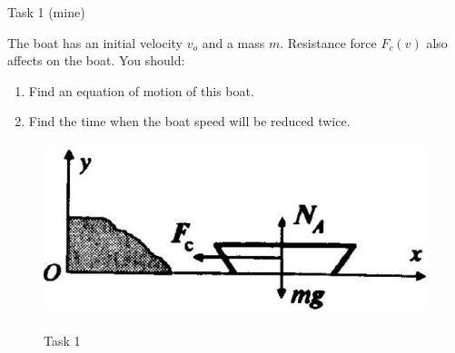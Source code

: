 \documentclass[aspectratio=169]{beamer}
\begin{document}
\begin{frame}[t]{Task 1 (mine)}
    \begin{minipage}{0.49\textwidth}
        The boat has an initial velocity $v_o$ and a mass $m$. Resistance force $F_c(v)$ also affects on the boat. You should:
        \begin{enumerate}
            \item Find an equation of motion of this boat.
            \item Find the time when the boat speed will be reduced twice.
        \end{enumerate}
    \end{minipage}
    \begin{minipage}{0.49\textwidth}
        \vspace{-0.8cm}
        \begin{figure}[H]
            \includegraphics[height=5cm,width=1\textwidth,keepaspectratio]{lab9_task1_fig.jpg}\\
            \caption*{Task 1}
        \end{figure}
    \end{minipage}
\end{frame}
\end{document}
